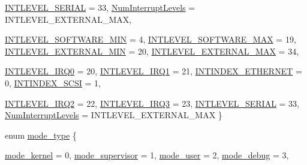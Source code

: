 \begin{DoxyCompactItemize}
\hyperlink{namespaceMipsISA_aa201d1f9b8ac67b80bdf6c08f370558ca6443c5917158463950c92bf8ec28a6eb}{INTLEVEL\_\-SERIAL} =  33, 
\hyperlink{namespaceMipsISA_aa201d1f9b8ac67b80bdf6c08f370558ca1b6c9928bdb9383e27bba1338b3f7e02}{NumInterruptLevels} =  INTLEVEL\_\-EXTERNAL\_\-MAX, 
\par
\hyperlink{namespaceMipsISA_aa201d1f9b8ac67b80bdf6c08f370558ca8db7857d98d7e42b3e02bed7c3c540ba}{INTLEVEL\_\-SOFTWARE\_\-MIN} =  4, 
\hyperlink{namespaceMipsISA_aa201d1f9b8ac67b80bdf6c08f370558ca9918551eda4baa1f4e11aaf334bb894b}{INTLEVEL\_\-SOFTWARE\_\-MAX} =  19, 
\hyperlink{namespaceMipsISA_aa201d1f9b8ac67b80bdf6c08f370558cafc78264c66a1ac704f17daa5fa9f9260}{INTLEVEL\_\-EXTERNAL\_\-MIN} =  20, 
\hyperlink{namespaceMipsISA_aa201d1f9b8ac67b80bdf6c08f370558cae599256ab529cbe8194cbdde120144f5}{INTLEVEL\_\-EXTERNAL\_\-MAX} =  34, 
\par
\hyperlink{namespaceMipsISA_aa201d1f9b8ac67b80bdf6c08f370558cadce4ff34f9aaeca71ba8d90672214bec}{INTLEVEL\_\-IRQ0} =  20, 
\hyperlink{namespaceMipsISA_aa201d1f9b8ac67b80bdf6c08f370558cad864f4251825107a9b1858c1fbc868c5}{INTLEVEL\_\-IRQ1} =  21, 
\hyperlink{namespaceMipsISA_aa201d1f9b8ac67b80bdf6c08f370558ca0fed6fcec83dc8d0bd48f50010ad9d0d}{INTINDEX\_\-ETHERNET} =  0, 
\hyperlink{namespaceMipsISA_aa201d1f9b8ac67b80bdf6c08f370558ca34f32f6cdf764c379b096e418b18f9c3}{INTINDEX\_\-SCSI} =  1, 
\par
\hyperlink{namespaceMipsISA_aa201d1f9b8ac67b80bdf6c08f370558caadce35d59b8bb4154d22aa7f6ab9036e}{INTLEVEL\_\-IRQ2} =  22, 
\hyperlink{namespaceMipsISA_aa201d1f9b8ac67b80bdf6c08f370558ca01099931d96b93a7403c65cd2ff5985d}{INTLEVEL\_\-IRQ3} =  23, 
\hyperlink{namespaceMipsISA_aa201d1f9b8ac67b80bdf6c08f370558ca6443c5917158463950c92bf8ec28a6eb}{INTLEVEL\_\-SERIAL} =  33, 
\hyperlink{namespaceMipsISA_aa201d1f9b8ac67b80bdf6c08f370558ca1b6c9928bdb9383e27bba1338b3f7e02}{NumInterruptLevels} =  INTLEVEL\_\-EXTERNAL\_\-MAX
 \}
\item 
enum \hyperlink{namespaceMipsISA_a19269c193c0c4866cdc4e5abd433f9fc}{mode\_\-type} \{ \par
\hyperlink{namespaceMipsISA_a19269c193c0c4866cdc4e5abd433f9fcaf9ca40d36bda60aea728f69a10a455a1}{mode\_\-kernel} =  0, 
\hyperlink{namespaceMipsISA_a19269c193c0c4866cdc4e5abd433f9fcab3d3f3b4766251166f2c8057fa484f19}{mode\_\-supervisor} =  1, 
\hyperlink{namespaceMipsISA_a19269c193c0c4866cdc4e5abd433f9fca7f68981a5aa91b746361d036f7e44f50}{mode\_\-user} =  2, 
\hyperlink{namespaceMipsISA_a19269c193c0c4866cdc4e5abd433f9fca8dadb017a33541c825091bafb0339e4c}{mode\_\-debug} =  3, 

\end{DoxyCompactItemize}
